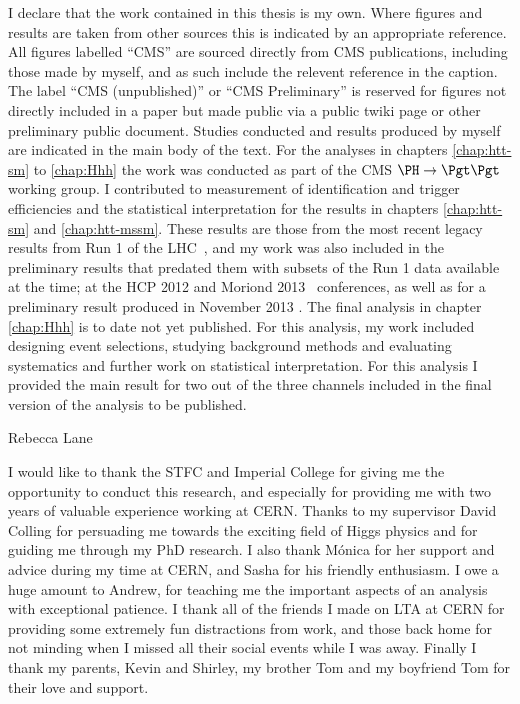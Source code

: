 \begin{declaration}
  I declare that the work contained in this thesis is my own. Where figures and
  results are taken from other sources this is indicated by an appropriate
  reference. All figures labelled ``CMS'' are sourced directly from CMS
  publications, including those made by myself, and as such include the
  relevent reference in the caption. The label ``CMS (unpublished)'' or ``CMS
  Preliminary'' is reserved for figures not directly included in a paper but 
  made public via a public twiki page or other preliminary public document.
  Studies conducted and results produced by myself are indicated in the main
  body of the text. For the analyses in chapters \ref{chap:htt-sm} to \ref{chap:Hhh}
  the work was conducted as part of the CMS $\PH\to\Pgt\Pgt$ working group. I
  contributed to measurement of identification and trigger efficiencies and
  the statistical interpretation for the results in chapters \ref{chap:htt-sm}
  and \ref{chap:htt-mssm}. These results are those from the most recent legacy results
  from Run 1 of the LHC~\cite{HIG-13-004,HIG-13-021}, and my work
  was also included in the preliminary results that predated them with subsets
  of the Run 1 data available at the time; at the HCP 2012
  \cite{CMS-PAS-HIG-12-050,CMS-PAS-HIG-12-043}
  and Moriond 2013~\cite{CMS-PAS-HIG-13-004-mor} conferences, as well as for a preliminary result
  produced in November 2013 \cite{CMS-PAS-HIG-13-021}. The final analysis in
  chapter \ref{chap:Hhh} is to date not yet published. For this
  analysis, my work included designing event selections, studying
  background methods and evaluating systematics and further work on statistical
  interpretation. For this analysis I provided the main result for two out of
  the three channels included in the final version of the analysis to be published.
  \vspace*{1cm}
  \begin{flushright}
    Rebecca Lane
  \end{flushright}
\end{declaration}


\begin{acknowledgements}
  I would like to thank the STFC and Imperial College for giving me the
  opportunity to conduct this research, and especially for providing me with two
  years of valuable experience working at CERN. Thanks to my supervisor David
  Colling for persuading me towards the exciting field of Higgs physics and for
  guiding me through my PhD research. I also thank M\'{o}nica for her
  support and advice during my time at CERN, and Sasha for his friendly
  enthusiasm. I owe a huge amount to Andrew, for teaching me the important
  aspects of an analysis with exceptional patience. I thank all of the friends I
  made on LTA at CERN for providing some extremely fun distractions from work, and those
  back home for not minding when I missed all their social events while I was
  away. Finally I thank my parents, Kevin and Shirley, my brother Tom and my
  boyfriend Tom for their love and support.  
\end{acknowledgements}


